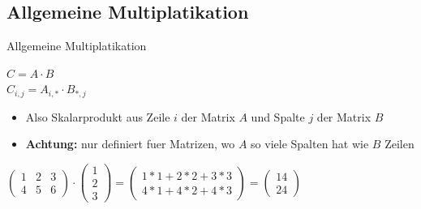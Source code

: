\documentclass[10pt,aspectratio=169]{beamer}
\begin{document}
  \subsection{Allgemeine Multiplatikation}
  \begin{frame}{Allgemeine Multiplatikation}
    \begin{center}
      $C = A \cdot B$ \\
      $C_{i,j} = A_{i,*} \cdot B_{*,j}$\\
    \end{center}
    \begin{itemize}
      \item Also Skalarprodukt aus Zeile $i$ der Matrix $A$ und Spalte $j$ der Matrix $B$
      \item \textbf{Achtung:} nur definiert fuer Matrizen, wo $A$ so viele Spalten hat wie $B$ Zeilen
    \end{itemize}
    \begin{center}
      $\begin{pmatrix}
        1 & 2 & 3\\
        4 & 5 & 6
      \end{pmatrix}
      \cdot
      \begin{pmatrix}
        1\\2\\3
      \end{pmatrix}
      = \begin{pmatrix}
        1*1 + 2*2 + 3*3 \\
        4*1 + 4*2 + 4*3
      \end{pmatrix} =
      \begin{pmatrix}
        14\\24
      \end{pmatrix}$
    \end{center}
  \end{frame}
\end{document}
